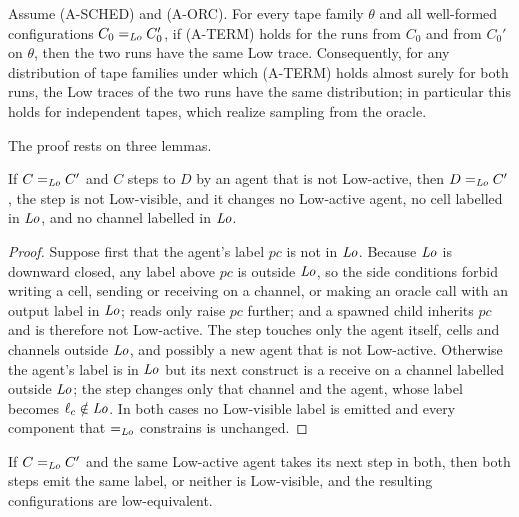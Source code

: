 \begin{theorem}[Noninterference]
\label{thm:ni}
Assume (A-SCHED) and (A-ORC). For every tape family $\theta$ and all well-formed configurations
$C_0 =_{\mathit{Lo}} C_0'$, if (A-TERM) holds for the runs from $C_0$ and from $C_0'$ on $\theta$,
then the two runs have the same Low trace.
Consequently, for any distribution of tape families under which (A-TERM) holds almost surely
for both runs, the Low traces of the two runs have the same distribution; in particular this
holds for independent tapes, which realize sampling from the oracle.
\end{theorem}

\noindent
The proof rests on three lemmas.

\begin{lemma}
\label{lem:ni-high}
If $C =_{\mathit{Lo}} C'$ and $C$ steps to $D$ by an agent that is not Low-active, then
$D =_{\mathit{Lo}} C'$, the step is not Low-visible, and it changes no Low-active agent, no cell
labelled in $\mathit{Lo}$, and no channel labelled in $\mathit{Lo}$.
\end{lemma}

\begin{proof}
Suppose first that the agent's label $\mathit{pc}$ is not in $\mathit{Lo}$.
Because $\mathit{Lo}$ is downward closed, any label above $\mathit{pc}$ is outside $\mathit{Lo}$, so the side
conditions forbid writing a cell, sending or receiving on a channel, or making an oracle call
with an output label in $\mathit{Lo}$; reads only raise $\mathit{pc}$ further; and a spawned child
inherits $\mathit{pc}$ and is therefore not Low-active.
The step touches only the agent itself, cells and channels outside $\mathit{Lo}$, and possibly a new
agent that is not Low-active.
Otherwise the agent's label is in $\mathit{Lo}$ but its next construct is a receive on a channel
labelled outside $\mathit{Lo}$; the step changes only that channel and the agent, whose label becomes
$\ell_c \notin \mathit{Lo}$.
In both cases no Low-visible label is emitted and every component that $=_{\mathit{Lo}}$ constrains is
unchanged.
\end{proof}

\begin{lemma}
\label{lem:ni-low}
If $C =_{\mathit{Lo}} C'$ and the same Low-active agent takes its next step in both, then both steps
emit the same label, or neither is Low-visible, and the resulting configurations are
low-equivalent.
\end{lemma}

